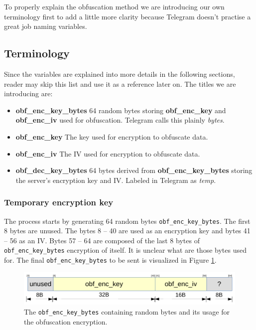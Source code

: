 \documentclass[thesis=M,english]{FITthesis}[2012/10/20]
\begin{document}
To properly explain the obfuscation method we are introducing our own terminology first to add a little more clarity because Telegram doesn't practise a great job naming variables.

\subsection{Terminology}

Since the variables are explained into more details in the following sections, reader may skip this list and use it as a reference later on. The titles we are introducing are:

\begin{itemize}
	\item \textbf{obf\_enc\_key\_bytes} 64 random bytes storing \textbf{obf\_enc\_key} and \textbf{obf\_enc\_iv} used for obfuscation. Telegram calls this plainly \emph{bytes}.
	\item \textbf{obf\_enc\_key} The key used for encryption to obfuscate data.
	\item \textbf{obf\_enc\_iv} The IV used for encryption to obfuscate data.
	\item \textbf{obf\_dec\_key\_bytes} 64 bytes derived from \textbf{obf\_enc\_key\_bytes} storing the server's encryption key and IV. Labeled in Telegram as \emph{temp}.
\end{itemize}

\subsubsection{Temporary encryption key}\label{code-obf-enc-key}

The process starts by generating 64 random bytes \texttt{obf\_enc\_key\_bytes}. The first 8 bytes are unused. The bytes 8 -- 40 are used as an encryption key and bytes 41 -- 56 as an IV. Bytes 57 -- 64 are composed of the last 8 bytes of \texttt{obf\_enc\_key\_bytes} encryption of itself. It is unclear what are those bytes used for. The final \texttt{obf\_enc\_key\_bytes} to be sent is visualized in Figure \ref{img:code-obfuscation-bytes-sent}.

\begin{figure}[htb]
	\centering
	\includegraphics[width=1\textwidth]{bytes-sent.pdf}
	\caption[Random bytes used for obfuscation]{The \texttt{obf\_enc\_key\_bytes} containing random bytes and its usage for the obfuscation encryption.}
	\label{img:code-obfuscation-bytes-sent}
\end{figure}
\end{document}
